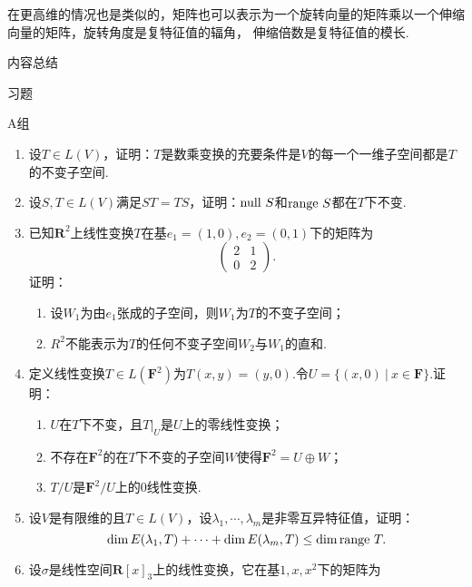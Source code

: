 在更高维的情况也是类似的，矩阵也可以表示为一个旋转向量的矩阵乘以一个伸缩向量的矩阵，旋转角度是复特征值的辐角，
伸缩倍数是复特征值的模长.

\vspace{2ex}
\centerline{\heiti \Large 内容总结}

\vspace{2ex}

\centerline{\heiti \Large 习题}
\vspace{2ex}
{\kaishu }
\begin{flushright}
    \kaishu

\end{flushright}
\centerline{\heiti A组}
\begin{enumerate}
    \item 设$T\in L(V)$，证明：$T$是数乘变换的充要条件是$V$的每一个一维子空间都是$T$的不变子空间.
	\item 设$S,T\in L(V)$满足$ST=TS$，证明：$\textup{null }S$和$\textup{range }S$都在$T$下不变.
	\item 已知$\mathbf{R}^2$上线性变换$T$在基$e_1=(1,0),e_2=(0,1)$下的矩阵为
    \[\begin{pmatrix}
		2 & 1 \\ 0 & 2
	\end{pmatrix}.\]证明：
	\begin{enumerate}[label=(\arabic*)]
        \item 设$W_1$为由$e_1$张成的子空间，则$W_1$为$T$的不变子空间；
        \item $R^2$不能表示为$T$的任何不变子空间$W_2$与$W_1$的直和.
    \end{enumerate}
	\item 定义线性变换$T\in L(\mathbf{F}^2)$为$T(x,y)=(y,0)$.令$U=\{(x,0)\ |\ x\in\mathbf{F}\}$.证明：
	\begin{enumerate}[label=(\arabic*)]
        \item $U$在$T$下不变，且$T|_{U}$是$U$上的零线性变换；
        \item 不存在$\mathbf{F}^2$的在$T$下不变的子空间$W$使得$\mathbf{F}^2=U\oplus W$；
        \item $T/U$是$\mathbf{F}^2/U$上的0线性变换.
    \end{enumerate}
	\item 设$V$是有限维的且$T\in L(V)$，设$\lambda_1,\cdots,\lambda_m$是非零互异特征值，证明：
	$$\dim E(\lambda_1,T)+\cdots+\dim E(\lambda_m,T)\le\dim\textup{range }T.$$
    \item 设$\sigma$是线性空间$\mathbf{R}[x]_3$上的线性变换，它在基$1,x,x^2$下的矩阵为

\end{enumerate}
